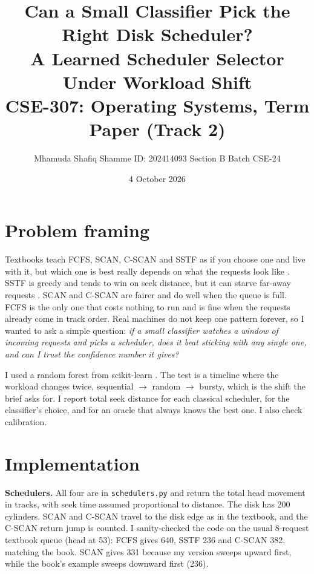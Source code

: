 \documentclass[10pt,a4paper]{article}
\title{\textbf{Can a Small Classifier Pick the Right Disk Scheduler?\\
A Learned Scheduler Selector Under Workload Shift}\\[2pt]
\large CSE-307: Operating Systems, Term Paper (Track 2)}
\author{Mhamuda Shafiq Shamme \quad ID: 202414093 \quad Section B \quad Batch CSE-24}
\date{4 October 2026}
\begin{document}
\maketitle
\vspace{-1.2em}

\section{Problem framing}
Textbooks teach FCFS, SCAN, C-SCAN and SSTF as if you choose one and live with it, but
which one is best really depends on what the requests look like \cite{silberschatz}.
SSTF is greedy and tends to win on seek distance, but it can starve far-away requests \cite{teorey}.
SCAN and C-SCAN are fairer and do well when the queue is full. FCFS is the only one that
costs nothing to run and is fine when the requests already come in track order.
Real machines do not keep one pattern forever, so I wanted to ask a simple question:
\emph{if a small classifier watches a window of incoming requests and picks a scheduler,
does it beat sticking with any single one, and can I trust the confidence number it gives?}

I used a random forest \cite{breiman} from scikit-learn \cite{sklearn}. The test is a timeline
where the workload changes twice, sequential $\rightarrow$ random $\rightarrow$ bursty, which is the
shift the brief asks for. I report total seek distance for each classical scheduler, for the
classifier's choice, and for an oracle that always knows the best one. I also check calibration.

\section{Implementation}
\textbf{Schedulers.} All four are in \texttt{schedulers.py} and return the total head movement
in tracks, with seek time assumed proportional to distance. The disk has 200 cylinders. SCAN and
C-SCAN travel to the disk edge as in the textbook, and the C-SCAN return jump is counted. I
sanity-checked the code on the usual 8-request textbook queue (head at 53): FCFS gives 640,
SSTF 236 and C-SCAN 382, matching the book. SCAN gives 331 because my version sweeps upward
first, while the book's example sweeps downward first (236).
\end{document}
